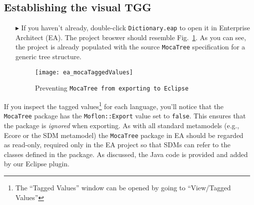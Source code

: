 \newpage
\hypertarget{initialize vis}{}
\subsection{Establishing the visual TGG}
\visHeader

\begin{itemize}

\item[$\blacktriangleright$] If you haven't already, double-click \texttt{Dict\-ion\-ary.eap} to open it in Enterprise Architect (EA). The project broswer
should resemble Fig.~\ref{ea:mocaTagged}. As you can see, the project is already populated with the source \texttt{MocaTree} specification for a generic tree structure.

\begin{figure}[htpb]
\begin{center}
  \texttt{[image: ea\_mocaTaggedValues]}
  \caption{Preventing \texttt{MocaTree from exporting to Eclipse}}
  \label{ea:mocaTagged}
\end{center}
\end{figure}

\end{itemize}

If you inspect the tagged values\footnote{The ``Tagged Values'' window can be opened by going to ``View/Tagged Values''} for each language, you'll notice that
the \texttt{MocaTree} package has the \texttt{Moflon::Export} value set to \texttt{false}. This ensures that the package is \emph{ignored} when exporting. As
with all standard metamodels (e.g., Ecore or the SDM metamodel) the \texttt{MocaTree} package in EA should be regarded as read-only, required only in the
EA project so that SDMs can refer to the classes defined in the package. As discussed, the Java code is provided and added by our Eclipse plugin.

